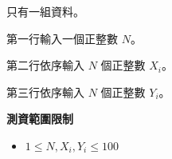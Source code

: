 只有一組資料。

第一行輸入一個正整數 $N$。

第二行依序輸入 $N$ 個正整數 $X_i$。

第三行依序輸入 $N$ 個正整數 $Y_i$。

\textbf{測資範圍限制}

\begin{itemize}

\item $1 \le N,X_i,Y_i \le 100$

\end{itemize}
